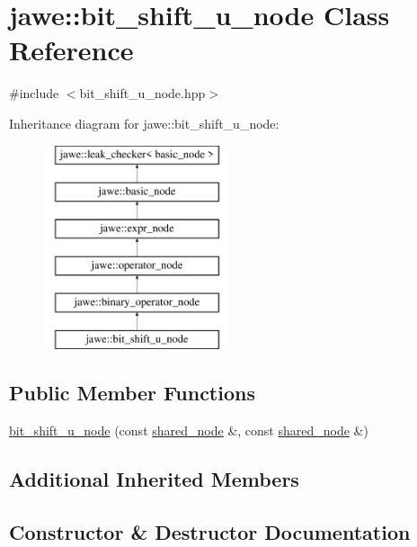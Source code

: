 \hypertarget{classjawe_1_1bit__shift__u__node}{}\section{jawe\+:\+:bit\+\_\+shift\+\_\+u\+\_\+node Class Reference}
\label{classjawe_1_1bit__shift__u__node}


{\ttfamily \#include $<$bit\+\_\+shift\+\_\+u\+\_\+node.\+hpp$>$}

Inheritance diagram for jawe\+:\+:bit\+\_\+shift\+\_\+u\+\_\+node\+:\begin{figure}[H]
\begin{center}
\leavevmode
\includegraphics[height=6.000000cm]{classjawe_1_1bit__shift__u__node}
\end{center}
\end{figure}
\subsection*{Public Member Functions}
\begin{DoxyCompactItemize}
\item 
\hyperlink{classjawe_1_1bit__shift__u__node_a786ec5035cd91619636126a2bcc01c54}{bit\+\_\+shift\+\_\+u\+\_\+node} (const \hyperlink{namespacejawe_a3f307481d921b6cbb50cc8511fc2b544}{shared\+\_\+node} \&, const \hyperlink{namespacejawe_a3f307481d921b6cbb50cc8511fc2b544}{shared\+\_\+node} \&)
\end{DoxyCompactItemize}
\subsection*{Additional Inherited Members}


\subsection{Constructor \& Destructor Documentation}
\mbox{\label{classjawe_1_1bit__shift__u__node_a786ec5035cd91619636126a2bcc01c54}} 
